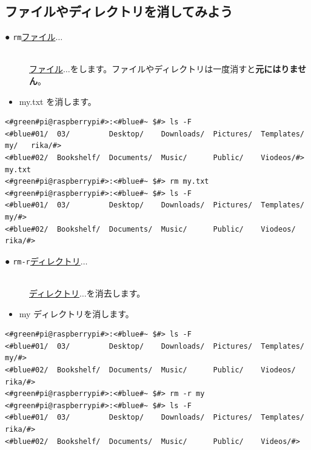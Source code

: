\subsection{ファイルやディレクトリを消してみよう}
\begin{description}
\item[● \texttt{rm}\textvisiblespace \underline{ファイル}$\ldots$]\mbox{}\\
\underline{ファイル}$\ldots$をします。ファイルやディレクトリは一度消すと\textbf{元にはりません}。
\end{description}
\begin{itemize}
\item[<例>]my.txt を消します。
\end{itemize}
\begin{lstlisting}[caption=rmの例, label=rm]
<#green#pi@raspberrypi#>:<#blue#~ $#> ls -F
<#blue#01/  03/         Desktop/    Downloads/  Pictures/  Templates/   my/   rika/#>
<#blue#02/  Bookshelf/  Documents/  Music/      Public/    Viodeos/#>     my.txt
<#green#pi@raspberrypi#>:<#blue#~ $#> rm my.txt
<#green#pi@raspberrypi#>:<#blue#~ $#> ls -F
<#blue#01/  03/         Desktop/    Downloads/  Pictures/  Templates/   my/#>
<#blue#02/  Bookshelf/  Documents/  Music/      Public/    Viodeos/     rika/#>     
\end{lstlisting}
\begin{description}
\item[● \texttt{rm}\textvisiblespace \texttt{-r}\textvisiblespace \underline{ディレクトリ}$\ldots$]\mbox{}\\
\underline{ディレクトリ}$\ldots$を消去します。
\end{description}
\newpage
\begin{itemize}
\item[<例>]my ディレクトリを消します。
\end{itemize}
\begin{lstlisting}[caption=rm -rの例, label=rm-R]
<#green#pi@raspberrypi#>:<#blue#~ $#> ls -F
<#blue#01/  03/         Desktop/    Downloads/  Pictures/  Templates/   my/#>
<#blue#02/  Bookshelf/  Documents/  Music/      Public/    Viodeos/     rika/#>     
<#green#pi@raspberrypi#>:<#blue#~ $#> rm -r my
<#green#pi@raspberrypi#>:<#blue#~ $#> ls -F
<#blue#01/  03/         Desktop/    Downloads/  Pictures/  Templates/   rika/#>
<#blue#02/  Bookshelf/  Documents/  Music/      Public/    Videos/#>
\end{lstlisting}

